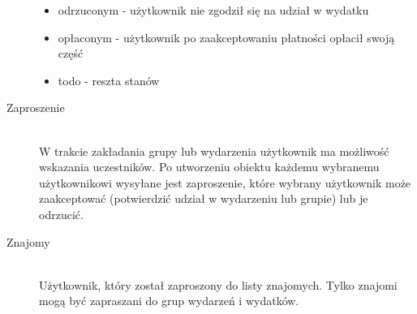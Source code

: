 \begin{description}
\begin{itemize}
    \item odrzuconym - użytkownik nie zgodził się na udział w wydatku
    \item opłaconym - użytkownik po zaakceptowaniu płatności opłacił swoją część
    \item todo - reszta stanów
  \end{itemize}
\item[Zaproszenie] \hfill \\ W trakcie zakładania grupy lub wydarzenia użytkownik ma możliwość wskazania uczestników. Po utworzeniu obiektu każdemu wybranemu użytkownikowi wysyłane jest zaproszenie, które wybrany użytkownik może zaakceptować (potwierdzić udział w wydarzeniu lub grupie) lub je odrzucić.
\item[Znajomy] \hfill \\ Użytkownik, który został zaproszony do listy znajomych. Tylko znajomi mogą być zapraszani do grup wydarzeń i wydatków.
\end{description}


